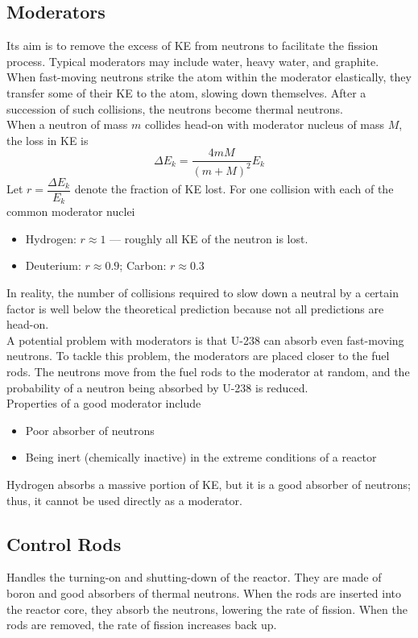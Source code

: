 \documentclass[a4paper,12pt]{article}
\newcommand{\lb}{\\[8pt]}
\begin{document}
\subsection{Moderators}

Its aim is to remove the excess of KE from neutrons to facilitate the fission process. Typical moderators may include water, heavy water, and graphite.\lb
When fast-moving neutrons strike the atom within the moderator elastically, they transfer some of their KE to the atom, slowing down themselves. After a succession of such collisions, the neutrons become thermal neutrons.\lb
When a neutron of mass $m$ collides head-on with moderator nucleus of mass $M$, the loss in KE is
$$\Delta E_k = \frac{4mM}{(m+M)^2}E_k$$
Let $r = \dfrac{\Delta E_k}{E_k}$ denote the fraction of KE lost. For one collision with each of the common moderator nuclei
\begin{itemize}
  \item Hydrogen: $r \approx 1$ --- roughly all KE of the neutron is lost.
  \item Deuterium: $r \approx 0.9$; Carbon: $r \approx 0.3$
\end{itemize}
In reality, the number of collisions required to slow down a neutral by a certain factor is well below the theoretical prediction because not all predictions are head-on.\lb
A potential problem with moderators is that U-238 can absorb even fast-moving neutrons. To tackle this problem, the moderators are placed closer to the fuel rods. The neutrons move from the fuel rods to the moderator at random, and the probability of a neutron being absorbed by U-238 is reduced.\lb
Properties of a good moderator include
\begin{itemize}
  \item Poor absorber of neutrons
  \item Being inert (chemically inactive) in the extreme conditions of a reactor
\end{itemize}
Hydrogen absorbs a massive portion of KE, but it is a good absorber of neutrons; thus, it cannot be used directly as a moderator.

\subsection{Control Rods}

Handles the turning-on and shutting-down of the reactor. They are made of boron and good absorbers of thermal neutrons. When the rods are inserted into the reactor core, they absorb the neutrons, lowering the rate of fission. When the rods are removed, the rate of fission increases back up.
\end{document}
